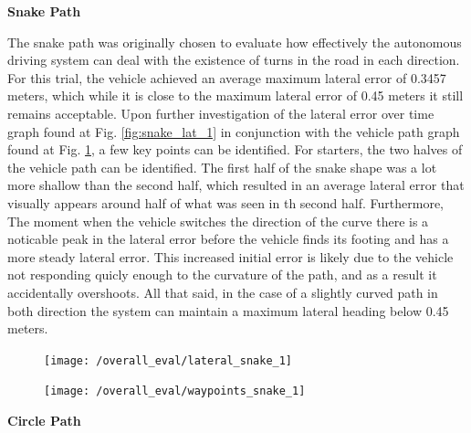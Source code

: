 \documentclass[titlepage,draft]{article}
\begin{document}
{\textbf{Snake Path}

The snake path was originally chosen to evaluate how effectively the autonomous driving system can deal with the existence of turns in the road in each direction. For this trial, the vehicle achieved an average maximum lateral error of 0.3457 meters, which while it is close to the maximum lateral error of 0.45 meters it still remains acceptable. Upon further investigation of the lateral error over time graph found at Fig. \ref{fig:snake_lat_1} in conjunction with the vehicle path graph found at Fig. \ref{fig:snake_way_1}, a few key points can be identified. For starters, the two halves of the vehicle path can be identified. The first half of the snake shape was a lot more shallow than the second half, which resulted in an average lateral error that visually appears around half of what was seen in th second half. Furthermore, The moment when the vehicle switches the direction of the curve there is a noticable peak in the lateral error before the vehicle finds its footing and has a more steady lateral error. This increased initial error is likely due to the vehicle not responding quicly enough to the curvature of the path, and as a result it accidentally overshoots. All that said, in the case of a slightly curved path in both direction the system can maintain a maximum lateral heading below 0.45 meters.

\begin{figure}
	\centering
	\begin{minipage}{.45\textwidth}
		\centering
		\texttt{[image: /overall\_eval/lateral\_snake\_1]}
		\label{fig:snake_lat_1}
	\end{minipage}%
	\hspace{0.1\textwidth}%
	\begin{minipage}{.45\textwidth}
		\centering
		\texttt{[image: /overall\_eval/waypoints\_snake\_1]}
		\label{fig:snake_way_1}
	\end{minipage}
\end{figure}

\textbf{Circle Path}

}
\end{document}
